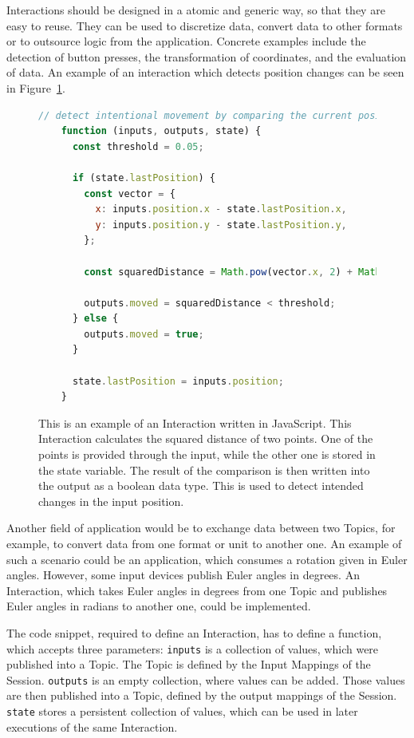 Interactions should be designed in a atomic and generic way, so that they are easy to reuse. They can be used to discretize data, convert data to other formats or to outsource logic from the application. Concrete examples include the detection of button presses, the transformation of coordinates, and the evaluation of data. An example of an interaction which detects position changes can be seen in Figure~\ref{fig:ubii-interaction-example}.

\begin{figure}[htpb]
  \begin{lstlisting}[language=JavaScript]
    // detect intentional movement by comparing the current position with a previous one
    function (inputs, outputs, state) {
      const threshold = 0.05;

      if (state.lastPosition) {
        const vector = {
          x: inputs.position.x - state.lastPosition.x,
          y: inputs.position.y - state.lastPosition.y,
        };
  
        const squaredDistance = Math.pow(vector.x, 2) + Math.pow(vector.y, 2);
  
        outputs.moved = squaredDistance < threshold;
      } else {
        outputs.moved = true;
      }

      state.lastPosition = inputs.position;
    }
  \end{lstlisting}
  \caption[Basic UBII interaction in JavaScript]{This is an example of an Interaction written in JavaScript. This Interaction calculates the squared distance of two points. One of the points is provided through the input, while the other one is stored in the state variable. The result of the comparison is then written into the output as a boolean data type. This is used to detect intended changes in the input position.}\label{fig:ubii-interaction-example}
\end{figure}

Another field of application would be to exchange data between two Topics, for example, to convert data from one format or unit to another one. An example of such a scenario could be an application, which consumes a rotation given in Euler angles. However, some input devices publish Euler angles in degrees. An Interaction, which takes Euler angles in degrees from one Topic and publishes Euler angles in radians to another one, could be implemented.

The code snippet, required to define an Interaction, has to define a function, which accepts three parameters: 
\lstinline{inputs} is a collection of values, which were published into a Topic. The Topic is defined by the Input Mappings of the Session. \lstinline{outputs} is an empty collection, where values can be added. Those values are then published into a Topic, defined by the output mappings of the Session. \lstinline{state} stores a persistent collection of values, which can be used in later executions of the same Interaction.